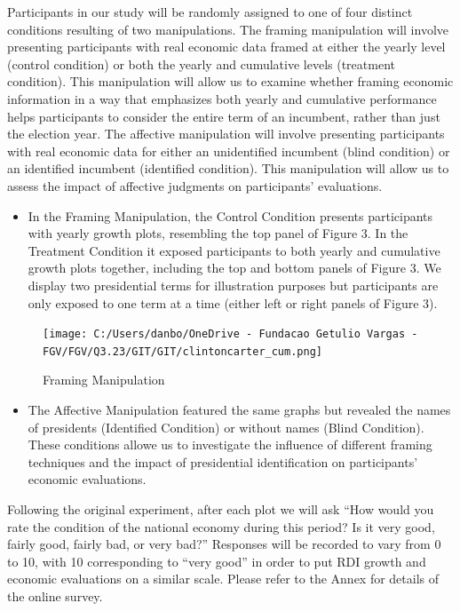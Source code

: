\documentclass[
]{article}
\providecommand{\tightlist}{%
  \setlength{\itemsep}{0pt}\setlength{\parskip}{0pt}}
\begin{document}
Participants in our study will be randomly assigned to one of four
distinct conditions resulting of two manipulations. The framing
manipulation will involve presenting participants with real economic
data framed at either the yearly level (control condition) or both the
yearly and cumulative levels (treatment condition). This manipulation
will allow us to examine whether framing economic information in a way
that emphasizes both yearly and cumulative performance helps
participants to consider the entire term of an incumbent, rather than
just the election year. The affective manipulation will involve
presenting participants with real economic data for either an
unidentified incumbent (blind condition) or an identified incumbent
(identified condition). This manipulation will allow us to assess the
impact of affective judgments on participants' evaluations.

\begin{itemize}
\tightlist
\item
  In the Framing Manipulation, the Control Condition presents
  participants with yearly growth plots, resembling the top panel of
  Figure 3. In the Treatment Condition it exposed participants to both
  yearly and cumulative growth plots together, including the top and
  bottom panels of Figure 3. We display two presidential terms for
  illustration purposes but participants are only exposed to one term at
  a time (either left or right panels of Figure 3).
\end{itemize}

\begin{figure}
\hypertarget{fig:label}{%
\centering
\texttt{[image: C:/Users/danbo/OneDrive - Fundacao Getulio Vargas - FGV/FGV/Q3.23/GIT/GIT/clintoncarter\_cum.png]}
\caption{Framing Manipulation}\label{fig:label}
}
\end{figure}

\begin{itemize}
\tightlist
\item
  The Affective Manipulation featured the same graphs but revealed the
  names of presidents (Identified Condition) or without names (Blind
  Condition). These conditions allowe us to investigate the influence of
  different framing techniques and the impact of presidential
  identification on participants' economic evaluations.
\end{itemize}

Following the original experiment, after each plot we will ask ``How
would you rate the condition of the national economy during this period?
Is it very good, fairly good, fairly bad, or very bad?'' Responses will
be recorded to vary from 0 to 10, with 10 corresponding to ``very good''
in order to put RDI growth and economic evaluations on a similar scale.
Please refer to the Annex for details of the online survey.
\end{document}
